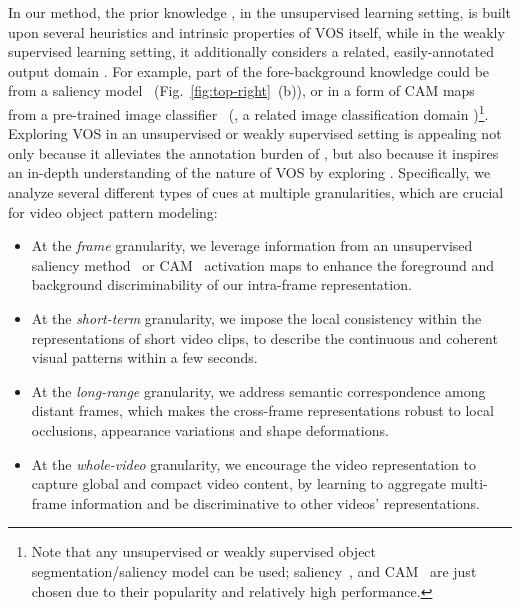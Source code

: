 \documentclass[10pt,twocolumn,letterpaper]{article}
\begin{document}
In our method, the prior knowledge , in the unsupervised learning setting, is built upon several heuristics and intrinsic properties of VOS itself, while in the weakly supervised learning setting, it additionally considers a related, easily-annotated output domain . For example, part of the fore-background knowledge could be from a saliency model~\!\cite{DBLP:conf/cvpr/YangZLRY13} (Fig.~\!\ref{fig:top-right}~\!(b)), or in a form of CAM maps~\!\cite{zeng2019multi,zhou2016learning} from a pre-trained image classifier~\!\cite{Huang_2017_CVPR} (\ie, a related image classification domain )\footnote{\scriptsize{Note that any unsupervised or weakly supervised object segmentation/saliency model can be used; saliency~\!\cite{DBLP:conf/cvpr/YangZLRY13}, and CAM~\!\cite{zeng2019multi,zhou2016learning} are just chosen due to their popularity and relatively high performance.}}. Exploring VOS in an unsupervised or weakly supervised
setting is appealing not only because it  alleviates the annotation burden of
, but also because it inspires  an in-depth
understanding of the nature of VOS by exploring
. Specifically, we analyze several different types of cues at multiple granularities, which are crucial for video object pattern modeling:
\vspace*{-0pt}
\begin{itemize}[leftmargin=*]
	\setlength{\itemsep}{0pt}
	\setlength{\parsep}{-2pt}
	\setlength{\parskip}{-0pt}
	\setlength{\leftmargin}{-13pt}
	\vspace{-5pt}
	\item At the \textit{frame} granularity, we leverage information from an unsupervised saliency method~\!\cite{DBLP:conf/cvpr/YangZLRY13} or CAM~\!\cite{zeng2019multi,zhou2016learning} activation maps to enhance the foreground and background discriminability of our intra-frame representation.
	\item At the \textit{short-term} granularity, we impose the local consistency within the representations of short video clips, to describe the continuous and coherent visual patterns within a few seconds.
	\item At the \textit{long-range} granularity, we address semantic correspondence among distant frames, which makes the cross-frame representations robust to local occlusions, appearance variations and shape deformations.
	\item At the \textit{whole-video} granularity, we encourage the video representation to capture global and compact video content, by learning to aggregate multi-frame information and be discriminative to other videos' representations.
	\vspace*{-2pt}
\end{itemize}
\end{document}
